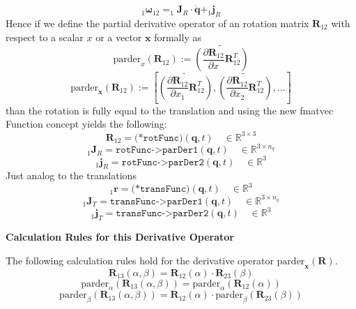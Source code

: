 \documentclass{report}
\newcommand{\bs}[1]{\boldsymbol #1}
\begin{document}
\begin{equation}
_1\bs{\omega}_{12}=_1\bs{J}_R\cdot \dot{\bs{q}} + _1\bs{j}_R
\end{equation}
Hence if we define the partial derivative operator of an rotation matrix $\bs{R}_{12}$ with respect to a scalar $x$ or a vector $\bs{x}$ formally as
\begin{equation}
\text{parder}_x(\bs{R}_{12}):=\widetilde{\left(\frac{\partial\bs{R}_{12}}{\partial x}\bs{R}_{12}^T\right)}
\end{equation}
\begin{equation}
\text{parder}_{\bs{x}}(\bs{R}_{12}):=\left[\widetilde{\left(\frac{\partial\bs{R}_{12}}{\partial x_1}\bs{R}_{12}^T\right)},\widetilde{\left(\frac{\partial\bs{R}_{12}}{\partial x_2}\bs{R}_{12}^T\right)},\dots\right]
\end{equation}
than the rotation is fully equal to the translation and using the new fmatvec Function concept yields the following:
\begin{equation}
\bs{R}_{12}=\texttt{(*rotFunc)}(\bs{q},t)\quad\in\mathbb{R}^{3\times 3}
\end{equation}
\begin{equation}
_1\bs{J}_R=\texttt{rotFunc->parDer1}(\bs{q},t)\quad\in\mathbb{R}^{3\times n_q}
\end{equation}
\begin{equation}
_1\bs{j}_R=\texttt{rotFunc->parDer2}(\bs{q},t)\quad\in\mathbb{R}^3
\end{equation}
Just analog to the translations
\begin{equation}
_1\bs{r}=\texttt{(*transFunc)}(\bs{q},t)\quad\in\mathbb{R}^3
\end{equation}
\begin{equation}
_1\bs{J}_T=\texttt{transFunc->parDer1}(\bs{q},t)\quad\in\mathbb{R}^{3\times n_q}
\end{equation}
\begin{equation}
_1\bs{j}_T=\texttt{transFunc->parDer2}(\bs{q},t)\quad\in\mathbb{R}^3
\end{equation}

\vspace{5em}
\textbf{\Large{Calculation Rules for this Derivative Operator}}
\vspace{3em}

The following calculation rules hold for the derivative operator $\text{parder}_{\bs{x}}(\bs{R})$.
\begin{equation}
  \bs{R}_{13}(\alpha,\beta) = \bs{R}_{12}(\alpha) \cdot \bs{R}_{23}(\beta)
\end{equation}
\begin{equation}
  \text{parder}_{\alpha}(\bs{R}_{13}(\alpha,\beta)) = \text{parder}_{\alpha}(\bs{R}_{12}(\alpha))
\end{equation}
\begin{equation}
  \text{parder}_{\beta}(\bs{R}_{13}(\alpha,\beta)) = \bs{R}_{12}(\alpha) \cdot \text{parder}_{\beta}(\bs{R}_{23}(\beta))
\end{equation}
\end{document}
